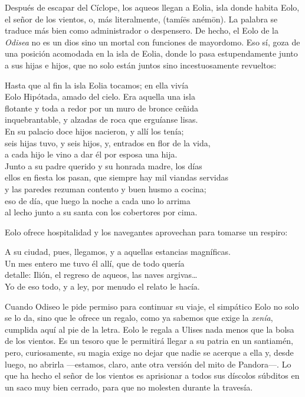\label{cap:eolo}

Después de escapar del Cíclope, los aqueos llegan a Eolia, isla donde habita Eolo, el señor de los vientos, o, más literalmente,  (tamíēs anémōn). La palabra  se traduce más bien como administrador o despensero. De hecho, el Eolo de la \emph{Odisea} no es un dios sino un mortal con funciones de mayordomo. Eso sí, goza de una posición acomodada en la isla de Eolia, donde lo pasa estupendamente junto a sus hijas e hijos, que no solo están juntos sino incestuosamente revueltos:

\begin{versocita}
Hasta que al fin la isla Eolia tocamos; en ella vivía\\
Eolo Hipótada, amado del cielo. Era aquella una isla\\
flotante y toda a redor por un muro de bronce ceñida\\
inquebrantable, y alzadas de roca que erguíanse lisas.\\
En su palacio doce hijos nacieron, y allí los tenía;\\
seis hijas tuvo, y seis hijos, y, entrados en flor de la vida,\\
a cada hijo le vino a dar él por esposa una hija.\\
Junto a su padre querido y su honrada madre, los días\\
ellos en fiesta los pasan, que siempre hay mil viandas servidas\\
y las paredes rezuman contento y buen husmo a cocina;\\
eso de día, que luego la noche a cada uno lo arrima\\
al lecho junto a su santa con los cobertores por cima.
\end{versocita}

Eolo ofrece hospitalidad y los navegantes aprovechan para tomarse un respiro:

\begin{versocita}
A su ciudad, pues, llegamos, y a aquellas estancias magníficas.\\
Un mes entero me tuvo él allí, que de todo quería\\
detalle: Ilión, el regreso de aqueos, las naves argivas…\\
Yo de eso todo, y a ley, por menudo el relato le hacía.
\end{versocita}

Cuando Odiseo le pide permiso para continuar su viaje, el simpático Eolo no solo se lo da, sino que le ofrece un regalo, como ya sabemos que exige la \emph{xenía}, cumplida aquí al pie de la letra. Eolo le regala a Ulises nada menos que la bolsa de los vientos. Es un tesoro que le permitirá llegar a su patria en un santiamén, pero, curiosamente, su magia exige no dejar que nadie se acerque a ella y, desde luego, no abrirla ---estamos, claro, ante otra versión del mito de Pandora---. Lo que ha hecho el señor de los vientos es aprisionar a todos sus díscolos súbditos en un saco muy bien cerrado, para que no molesten durante la travesía.

